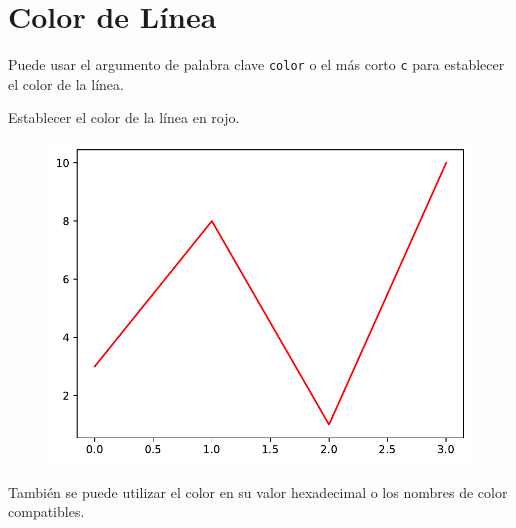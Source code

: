\section{Color de Línea}

Puede usar el argumento de palabra clave \texttt{color} o el más corto
\texttt{c} para establecer el color de la línea.

\begin{code} Establecer el color de la línea en rojo.

\begin{Shaded}
\begin{Highlighting}[]

\OperatorTok{=}\NormalTok{ np.array([}\NormalTok{, }\NormalTok{, }\NormalTok{, }\NormalTok{])}

\OperatorTok{=} \NormalTok{)}
\end{Highlighting}
\end{Shaded}

\begin{figure}
  \centering
  \includegraphics[scale=0.6]{img/grafica1019.pdf}
\end{figure}
\end{code}

También se puede utilizar el color en su valor hexadecimal o los nombres
de color compatibles.


